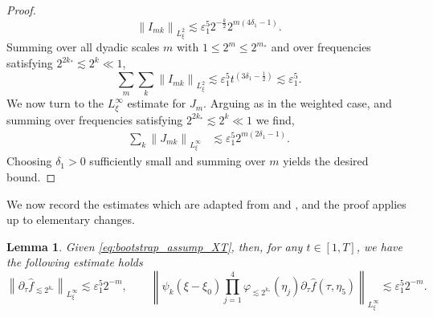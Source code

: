 \documentclass[reqno,english,11pt]{amsart}
\newcommand{\eps}{\varepsilon}
\newcommand{\snorm}[1]{\left\|#1\right\|}
\newtheorem{lemma}[theorem]{Lemma}
\theoremstyle{definition}
\numberwithin{equation}{section}
\begin{document}
\begin{proof}
\begin{equation*}
    \snorm{I_{mk}}_{L^2_\xi}\lesssim \eps_1^5 2^{-\frac{k}{2}}2^{m(4\delta_1-1)}.
\end{equation*}
Summing over all dyadic scales $m$ with $1 \le 2^m \le 2^{m_*}$ and
over frequencies satisfying $2^{2k_*} \lesssim 2^k \ll 1$,
$$
\sum_m \sum_k \snorm{I_{mk}}_{L^2_{\xi}} \lesssim \eps_1^5  t^{\left(3\delta_1 - \frac{1}{2}\right)}\lesssim \eps_1^5.
$$
We now turn to the $L^\infty_\xi$ estimate for $J_m$. Arguing as in the weighted case, and summing over frequencies satisfying $2^{2k_*} \lesssim 2^k \ll 1$ we find,
\begin{align*}
     \sum_k \snorm{J_{mk}}_{L^{\infty}_{\xi}} &\lesssim \eps_1^5 2^{m\left(2\delta_1-1\right)}. 
     \end{align*}
Choosing $\delta_1>0$ sufficiently small and summing over $m$ yields the desired bound.
\end{proof}

We now record the estimates which are adapted from \cite[lemma ~4.1]{Morgan} and \cite[lemma ~4.2]{Morgan}, and the proof applies up to elementary changes.
\begin{lemma}\label{lem:time_derivative_bnd}
Given \eqref{eq:bootstrap_assump_XT}, then, for any $t \in [1, T]$, we have the following estimate holds
\begin{equation}\label{eqn:time_derivative_bnd}
\snorm{\partial_{\tau}\widehat{f}_{\lesssim 2^{k_{*}}}}_{L^{\infty}_{\xi}} \lesssim \eps_1^5 2^{-m},\qquad
\snorm{\psi_{k}\left(\xi-\xi_0\right)\prod^4_{j=1}\varphi_{\lesssim 2^{k_{*}}}\left(\eta_j\right)\partial_{\tau}\hat{f}\left(\tau,\eta_5\right)}_{L^{\infty}_{\xi}} \lesssim \eps_1^5 2^{-m}. 
\end{equation}
\end{lemma}
\end{document}
